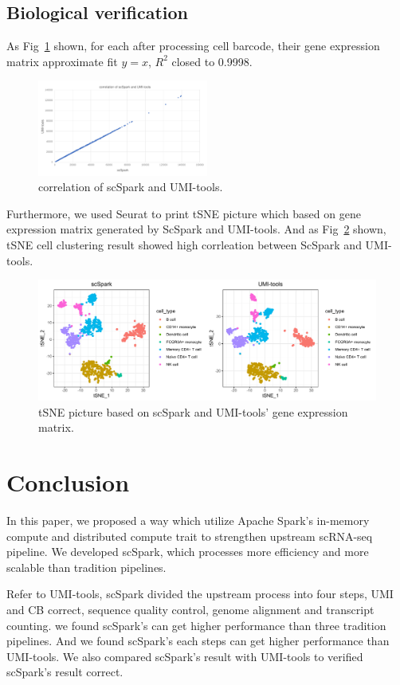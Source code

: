 \documentclass[conference]{IEEEtran}
\begin{document}
\subsection{Biological verification} 
As Fig~\ref{fig9} shown, for each after processing cell barcode, their gene expression matrix approximate fit $y=x$, $R^{2}$ closed to 0.9998. 
\begin{figure}
  \includegraphics[width=0.5\textwidth]{fig9.pdf}
  \caption{correlation of scSpark and UMI-tools.} \label{fig9}
\end{figure}
Furthermore, we used Seurat to print tSNE picture which based on gene expression matrix generated by ScSpark and UMI-tools. 
And as Fig~\ref{fig10} shown, tSNE cell clustering result showed high corrleation between ScSpark and UMI-tools. 
\begin{figure}
  \includegraphics[width=\textwidth]{fig10.pdf}
  \caption{tSNE picture based on scSpark and UMI-tools' gene expression matrix.} \label{fig10}
\end{figure}

\section{Conclusion}
In this paper, we proposed a way which utilize Apache Spark's in-memory compute and distributed compute trait to strengthen upstream scRNA-seq pipeline.
We developed scSpark, which processes more efficiency and more scalable than tradition pipelines.

Refer to UMI-tools, scSpark divided the upstream process into four steps, UMI and CB correct, sequence quality control, genome alignment and transcript counting.
we found scSpark's can get higher performance than three tradition pipelines.
And we found scSpark's each steps can get higher performance than UMI-tools.
We also compared scSpark's result with UMI-tools to verified scSpark's result correct.



\end{document}

